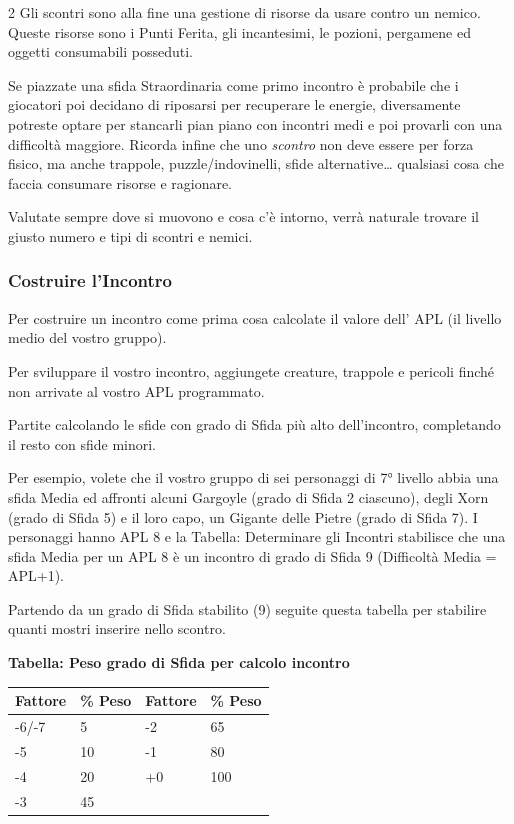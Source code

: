\begin{multicols}{2}
Gli scontri sono alla fine una gestione di risorse da usare contro un nemico. Queste risorse sono i Punti Ferita, gli incantesimi, le pozioni, pergamene ed oggetti consumabili posseduti.

Se piazzate una sfida Straordinaria come primo incontro è probabile che i giocatori poi decidano di riposarsi per recuperare le energie, diversamente potreste optare per stancarli pian piano con incontri medi e poi provarli con una difficoltà maggiore. Ricorda infine che uno \emph{scontro} non deve essere per forza fisico, ma anche trappole, puzzle/indovinelli, sfide alternative… qualsiasi cosa che faccia consumare risorse e ragionare.

Valutate sempre dove si muovono e cosa c'è intorno, verrà naturale trovare il giusto numero e tipi di scontri e nemici.

\subsubsection{Costruire l'Incontro}\label{costruireincontro}

Per costruire un incontro come prima cosa calcolate il valore dell' APL (il livello medio del vostro gruppo).

Per sviluppare il vostro incontro, aggiungete creature, trappole e pericoli finché non arrivate al vostro APL programmato.

Partite calcolando le sfide con grado di Sfida più alto dell'incontro, completando il resto con sfide minori.

Per esempio, volete che il vostro gruppo di sei personaggi di 7° livello abbia una sfida Media ed affronti alcuni Gargoyle (grado di Sfida 2 ciascuno), degli Xorn (grado di Sfida 5) e il loro capo, un Gigante delle Pietre (grado di Sfida 7). I personaggi hanno APL 8 e la Tabella: Determinare gli Incontri stabilisce che una sfida Media per un APL 8 è un incontro di grado di Sfida 9 (Difficoltà Media = APL+1).

Partendo da un grado di Sfida stabilito (9) seguite questa tabella per stabilire quanti mostri inserire nello scontro.

\medskip

\textbf{Tabella: Peso grado di Sfida per calcolo incontro}

\medskip

\noindent\begin{tabularx}{\linewidth}{X|l|X|l|}
	\toprule
\rowcolor{gray!20}\textbf{Fattore} & \textbf{\% Peso} &\textbf{Fattore} & \textbf{\% Peso}\\
\toprule
-6/-7& 5  & -2 & 65 \\
\rowcolor{gray!20}-5& 10    & -1 & 80 \\
-4& 20    & +0 & 100\\
\rowcolor{gray!20}-3& 45    &    & \\
\end{tabularx}


\end{multicols}
